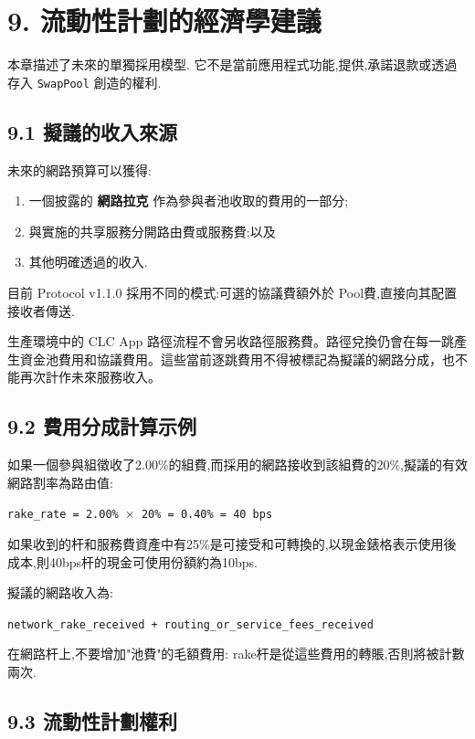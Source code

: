 \documentclass[11pt]{article}
\begin{document}
\section*{9. 流動性計劃的經濟學建議}

本章描述了未來的單獨採用模型. 它不是當前應用程式功能,提供,承諾退款或透過存入 \texttt{SwapPool} 創造的權利.

\subsection*{9.1 擬議的收入來源}

未來的網路預算可以獲得:

\begin{enumerate}[leftmargin=*]
\item 一個披露的 \textbf{網路拉克} 作為參與者池收取的費用的一部分;
\item 與實施的共享服務分開路由費或服務費;以及
\item 其他明確透過的收入.
\end{enumerate}
目前 Protocol v1.1.0 採用不同的模式:可選的協議費額外於 Pool費,直接向其配置接收者傳送.

生產環境中的 CLC App 路徑流程不會另收路徑服務費。路徑兌換仍會在每一跳產生資金池費用和協議費用。這些當前逐跳費用不得被標記為擬議的網路分成，也不能再次計作未來服務收入。

\subsection*{9.2 費用分成計算示例}

如果一個參與組徵收了2.00\%的組費,而採用的網路接收到該組費的20\%,擬議的有效網路割率為路由值:

\texttt{rake\_rate = 2.00\% $\times$ 20\% = 0.40\% = 40 bps}

如果收到的杆和服務費資產中有25\%是可接受和可轉換的,以現金錶格表示使用後成本,則40bps杆的現金可使用份額約為10bps.

擬議的網路收入為:

\texttt{network\_rake\_received + routing\_or\_service\_fees\_received}

在網路杆上,不要增加"池費"的毛額費用: rake杆是從這些費用的轉賬,否則將被計數兩次.

\subsection*{9.3 流動性計劃權利}
\end{document}
